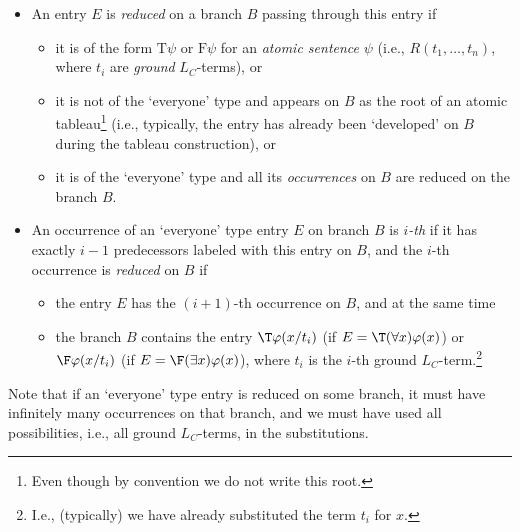 \begin{definition}
\begin{itemize}
        \item An entry $E$ is \emph{reduced} on a branch $B$ passing through this entry if 
        \begin{itemize}
            \item it is of the form $\mathrm{T}\psi$ or $\mathrm{F}\psi$ for an \emph{atomic sentence} $\psi$ (i.e., $R(t_1,\dots,t_n)$, where $t_i$ are \emph{ground} $L_C$-terms), or
            \item it is not of the `everyone' type and appears on $B$ as the root of an atomic tableau\footnote{Even though by convention we do not write this root.} (i.e., typically, the entry has already been `developed' on $B$ during the tableau construction), or
            \item it is of the `everyone' type and all its \emph{occurrences} on $B$ are reduced on the branch $B$.
        \end{itemize}
        \item An occurrence of an `everyone' type entry $E$ on branch $B$ is \emph{$i$-th} if it has exactly $i-1$ predecessors labeled with this entry on $B$, and the $i$-th occurrence is \emph{reduced} on $B$ if
        \begin{itemize}
            \item the entry $E$ has the $(i+1)$-th occurrence on $B$, and at the same time
            \item the branch $B$ contains the entry $\T\varphi(x/t_i)$ (if $E=\T(\forall x)\varphi(x)$) or $\F\varphi(x/t_i)$ (if $E=\F(\exists x)\varphi(x)$), where $t_i$ is the $i$-th ground $L_C$-term.\footnote{I.e., (typically) we have already substituted the term $t_i$ for $x$.}
        \end{itemize} 
    \end{itemize}
\end{definition}
Note that if an `everyone' type entry is reduced on some branch, it must have infinitely many occurrences on that branch, and we must have used all possibilities, i.e., all ground $L_C$-terms, in the substitutions.

